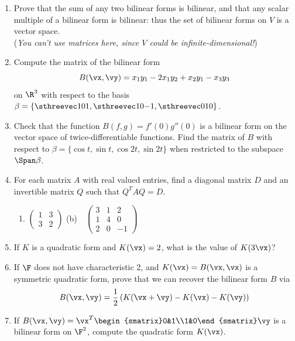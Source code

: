  
\begin{exercises}
\begin{enumerate}[label=\thesubsection.\arabic*., align=right]
  \item Prove that the sum of any two bilinear forms is bilinear, and that any scalar multiple of a bilinear form is bilinear: thus the set of bilinear forms on $V$ is a vector space.\\
  (\emph{You can't use matrices here, since $V$ could be infinite-dimensional!})
  
  \item Compute the matrix of the bilinear form
  \[B(\vx,\vy)=x_1y_1-2x_1y_2+x_2y_1-x_3y_3\]
  on $\R^3$ with respect to the basis $\beta=\left\{\sthreevec 101,\sthreevec 10{-1},\sthreevec 010\right\}$.
  
  \item Check that the function $B(f,g)=f'(0)g''(0)$ is a bilinear form on the vector space of twice-differentiable functions. Find the matrix of $B$ with respect to $\beta=\{\cos t,\sin t,\cos 2t,\sin 2t\}$ when restricted to the subspace $\Span\beta$.
  
  \item For each matrix $A$ with real valued entries, find a diagonal matrix $D$ and an invertible matrix $Q$ such that $Q^TAQ=D$.
  \begin{enumerate}
    \item $\begin{pmatrix}
    1&3\\3&2
    \end{pmatrix}$\qquad
    (b)\ \ $\begin{pmatrix}
    3&1&2\\1&4&0\\2&0&-1
    \end{pmatrix}$
  \end{enumerate}
  
  \item If $K$ is a quadratic form and $K(\vx)=2$, what is the value of $K(3\vx)$?
  
  \item If $\F$ does not have characteristic 2, and $K(\vx)=B(\vx,\vx)$ is a symmetric quadratic form, prove that we can recover the bilinear form $B$ via
		\[B(\vx,\vy)=\frac 12\left(K(\vx+\vy)-K(\vx)-K(\vy)\right)\]
  
  \item If $B(\vx,\vy)=\vx^T\begin{smatrix}0&1\\1&0\end{smatrix}\vy$ is a bilinear form on $\F^2$, compute the quadratic form $K(\vx)$.
  

\end{enumerate}
\end{exercises}
